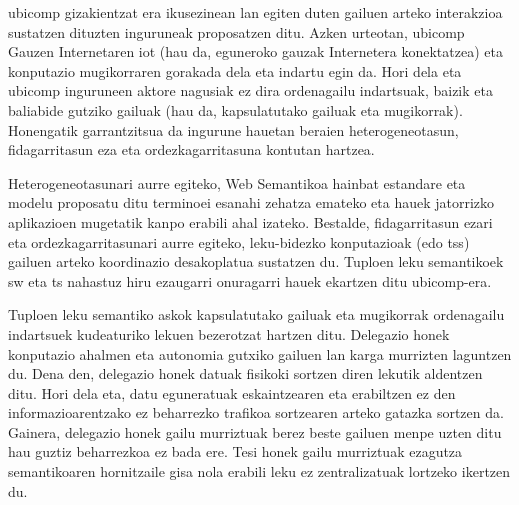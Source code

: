 \begin{resumen}
\end{resumen}



\begin{laburpena}        %
\acf{ubicomp} gizakientzat era ikusezinean lan egiten duten gailuen arteko interakzioa sustatzen dituzten inguruneak proposatzen ditu. %
Azken urteotan, \ac{ubicomp} Gauzen Internetaren \acs{iot} (hau da, eguneroko gauzak Internetera konektatzea) eta konputazio mugikorraren gorakada dela eta indartu egin da.
Hori dela eta \ac{ubicomp} inguruneen aktore nagusiak ez dira ordenagailu indartsuak, baizik eta baliabide gutziko gailuak (hau da, kapsulatutako gailuak eta mugikorrak). %
Honengatik garrantzitsua da ingurune hauetan beraien heterogeneotasun, fidagarritasun eza eta ordezkagarritasuna kontutan hartzea.


Heterogeneotasunari aurre egiteko, Web Semantikoa hainbat estandare eta modelu proposatu ditu terminoei esanahi zehatza emateko eta hauek jatorrizko aplikazioen mugetatik kanpo erabili ahal izateko.
Bestalde, fidagarritasun ezari eta ordezkagarritasunari aurre egiteko, leku-bidezko konputazioak (edo \aclp{ts}) gailuen arteko koordinazio desakoplatua sustatzen du. %
Tuploen leku semantikoek \acl{sw} eta \acl{ts} nahastuz hiru ezaugarri onuragarri hauek ekartzen ditu \ac{ubicomp}-era.


Tuploen leku semantiko askok kapsulatutako gailuak eta mugikorrak ordenagailu indartsuek kudeaturiko lekuen bezerotzat hartzen ditu.
Delegazio honek konputazio ahalmen eta autonomia gutxiko gailuen lan karga murrizten laguntzen du. %
Dena den, delegazio honek datuak fisikoki sortzen diren lekutik aldentzen ditu.
Hori dela eta, datu eguneratuak eskaintzearen eta erabiltzen ez den informazioarentzako ez beharrezko trafikoa sortzearen arteko gatazka sortzen da.
Gainera, delegazio honek gailu murriztuak berez beste gailuen menpe uzten ditu hau guztiz beharrezkoa ez bada ere. %
Tesi honek gailu murriztuak ezagutza semantikoaren hornitzaile gisa nola erabili leku ez zentralizatuak lortzeko ikertzen du. %



\end{laburpena}
